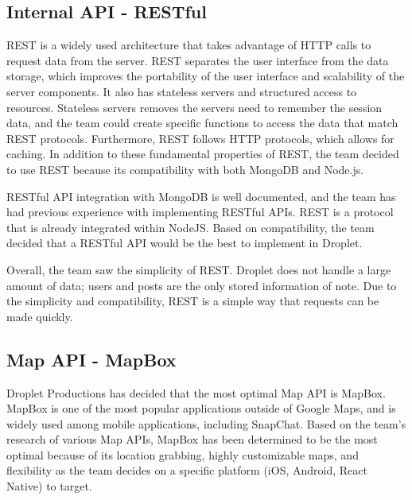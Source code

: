 \documentclass[draftclsnofoot, onecolumn, letterpaper,10pt,compsoc]{IEEEtran}
\begin{document}
\subsection{Internal API - RESTful}

REST is a widely used architecture that takes advantage of HTTP calls to request data from the server. REST separates the user interface from the data storage, which improves the portability of the user interface and scalability of the server components. It also has stateless servers and structured access to resources. Stateless servers removes the servers need to remember the session data, and the team could create specific functions to access the data that match REST protocols. Furthermore, REST follows HTTP protocols, which allows for caching. In addition to these fundamental properties of REST, the team decided to use REST because its compatibility with both MongoDB and Node.js. \cite{restcompatability}

RESTful API integration with MongoDB is well documented, and the team has had previous experience with implementing RESTful APIs. REST is a protocol that is already integrated within NodeJS. Based on compatibility, the team decided that a RESTful API would be the best to implement in Droplet.

Overall, the team saw the simplicity of REST. Droplet does not handle a large amount of data; users and posts are the only stored information of note. Due to the simplicity and compatibility, REST is a simple way that requests can be made quickly.


\subsection{Map API - MapBox}
Droplet Productions has decided that the most optimal Map API is MapBox. MapBox is one of the most popular applications outside of Google Maps, and is widely used among mobile applications, including SnapChat. Based on the team's research of various Map APIs, MapBox has been determined to be the most optimal because of its location grabbing, highly customizable maps, and flexibility as the team decides on a specific platform (iOS, Android, React Native) to target.
\end{document}
